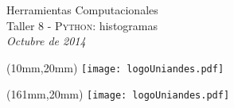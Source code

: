\documentclass[11pt,letterpaper]{exam}
\begin{document}
\begin{center}
{\Large Herramientas Computacionales} \\
Taller 8 - \textsc{Python}: histogramas \\
{\small \it Octubre de 2014}
\end{center}

\begin{textblock*}{40mm}(10mm,20mm)
  \texttt{[image: logoUniandes.pdf]}
\end{textblock*}

\begin{textblock*}{40mm}(161mm,20mm)
  \texttt{[image: logoUniandes.pdf]}
\end{textblock*}

\vspace{1cm}
\end{document}
